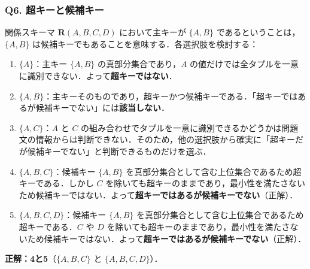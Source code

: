 \subsubsection*{Q6. 超キーと候補キー}
関係スキーマ $\boldsymbol{R}(A, B, C, D)$ において主キーが $\{A, B\}$ であるということは，$\{A, B\}$ は候補キーでもあることを意味する．各選択肢を検討する：
\begin{enumerate}
    \item $\{A\}$：主キー $\{A, B\}$ の真部分集合であり，$A$ の値だけでは全タプルを一意に識別できない．よって\textbf{超キーではない}．
    \item $\{A, B\}$：主キーそのものであり，超キーかつ候補キーである．「超キーではあるが候補キーでない」には\textbf{該当しない}．
    \item $\{A, C\}$：$A$ と $C$ の組み合わせでタプルを一意に識別できるかどうかは問題文の情報からは判断できない．そのため，他の選択肢から確実に「超キーだが候補キーでない」と判断できるものだけを選ぶ．
    \item $\{A, B, C\}$：候補キー $\{A, B\}$ を真部分集合として含む上位集合であるため超キーである．しかし $C$ を除いても超キーのままであり，最小性を満たさないため候補キーではない．よって\textbf{超キーではあるが候補キーでない}（正解）．
    \item $\{A, B, C, D\}$：候補キー $\{A, B\}$ を真部分集合として含む上位集合であるため超キーである．$C$ や $D$ を除いても超キーのままであり，最小性を満たさないため候補キーではない．よって\textbf{超キーではあるが候補キーでない}（正解）．
\end{enumerate}
\textbf{正解：4と5}（$\{A, B, C\}$ と $\{A, B, C, D\}$）．

